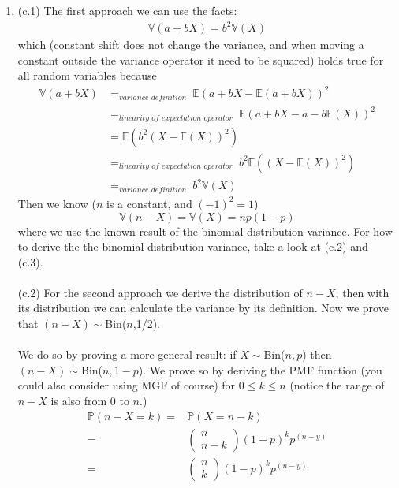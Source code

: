 \begin{exercise} [BH.4.21]
\begin{solution}
\begin{enumerate}
		\item  (c.1) The first approach we can use the facts: \begin{align*}
			\mathbb{V}(a+bX)=b^2\mathbb{V}(X)
		\end{align*} 
		which (constant shift does not change the variance, and when moving a constant outside the variance operator it need to  be squared) holds true for all random variables because 
		\begin{align*}
			\mathbb{V}(a+bX)&=_{\textit{variance definition~}} \mathbb{E}\left( a+bX -\mathbb{E}(a+bX) \right)^2 \\&=_{\textit{linearity of expectation operator~}} \mathbb{E}\left( a+bX -a-b\mathbb{E}(X) \right)^2 \\ &=  \mathbb{E}\left(b^2\left( X -\mathbb{E}(X) \right)^2\right) \\ &=_{\textit{linearity of expectation operator~}} b^2\mathbb{E}\left(\left( X -\mathbb{E}(X) \right)^2\right) \\ 
			&=_{\textit{variance definition~}} b^2\mathbb{V}(X) 
		\end{align*} 
		Then we know ($n$ is a constant, and $(-1)^2=1$)  $$\mathbb{V}(n-X)=\mathbb{V}(X)=np(1-p)$$ where we use the known result of the binomial distribution variance. For how to derive the the binomial distribution variance, take a look at (c.2) and (c.3).\\~\\ (c.2) For the second approach we derive the distribution of $n-X$, then with its distribution we can calculate the variance by its definition. Now we prove that  $(n-X)\sim$Bin($n$,1/2).  \\~\\
		We do so by proving a more general result: if $X\sim$Bin($n,p$) then $(n-X)\sim$Bin($n,1-p$). We prove so by deriving the PMF function (you could also consider using MGF of course) for $0\leq k\leq n$ (notice the range of $n-X$ is also from 0 to $n$.)
		\begin{align*}
			\mathbb{P}\left(n-X= k \right)=& \mathbb{P}\left(X= n-k \right)\\=& 
			\left(\begin{matrix}
				n \\ n-k
			\end{matrix} \right) (1-p)^kp^{(n-y)}\\=& 
			\left(\begin{matrix}
				n \\ k
			\end{matrix} \right) (1-p)^kp^{(n-y)}

\end{align*}
\end{enumerate}
\end{solution}
\end{exercise}
